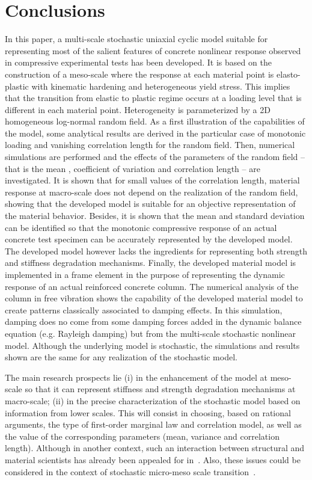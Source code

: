 \documentclass[12p]{amsart}
\begin{document}
\section{Conclusions}

In this paper, a multi-scale stochastic uniaxial cyclic model suitable for representing most of the salient features of concrete nonlinear response observed in compressive experimental tests has been developed. It is based on the construction of a meso-scale where the response at each material point is elasto-plastic with kinematic hardening and heterogeneous yield stress. This implies that the transition from elastic to plastic regime occurs at a loading level that is different in each material point. Heterogeneity is parameterized by a 2D homogeneous log-normal random field. As a first illustration of the capabilities of the model, some analytical results are derived in the particular case of monotonic loading and vanishing correlation length for the random field. Then, numerical simulations are performed and the effects of the parameters of the random field -- that is the mean , coefficient of variation  and correlation length  -- are investigated. It is shown that for small values of the correlation length, material response at macro-scale does not depend on the realization of the random field, showing that the developed model is suitable for an objective representation of the material behavior. Besides, it is shown that the mean  and standard deviation  can be identified so that the monotonic compressive response of an actual concrete test specimen can be accurately represented by the developed model. The developed model however lacks the ingredients for representing both strength and stiffness degradation mechanisms. Finally, the developed material model is implemented in a frame element in the purpose of representing the dynamic response of an actual reinforced concrete column. The numerical analysis of the column in free vibration shows the capability of the developed material model to create patterns classically associated to damping effects. In this simulation, damping does no come from some damping forces added in the dynamic balance equation (e.g. Rayleigh damping) but from the multi-scale stochastic nonlinear model. Although the underlying model is stochastic, the simulations and results shown are the same for any realization of the stochastic model.

The main research prospects lie (i) in the enhancement of the model at meso-scale so that it can represent stiffness and strength degradation mechanisms at macro-scale; (ii) in the precise characterization of the stochastic model based on information from lower scales. This will consist in choosing, based on rational arguments, the type of first-order marginal law and correlation model, as well as the value of the corresponding parameters (mean, variance and correlation length). Although in another context, such an interaction between structural and material scientists has already been appealed for in~\cite{ChaSchPel2007}. Also, these issues could be considered in the context of stochastic micro-meso scale transition~\cite{Soize2008,ArnGha2008,Cot-et-al2011}.
\end{document}
